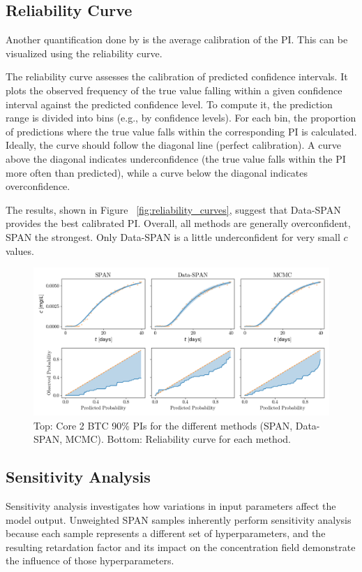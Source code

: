\subsection{Reliability Curve}
Another quantification done by \cite{finn} is the average calibration of the PI. This can be visualized using the reliability curve.

The reliability curve assesses the calibration of predicted confidence intervals. It plots the observed frequency of the true value falling within a given confidence interval against the predicted confidence level. To compute it, the prediction range is divided into bins (e.g., by confidence levels). For each bin, the proportion of predictions where the true value falls within the corresponding PI is calculated. Ideally, the curve should follow the diagonal line (perfect calibration). A curve above the diagonal indicates underconfidence (the true value falls within the PI more often than predicted), while a curve below the diagonal indicates overconfidence.

The results, shown in Figure ~\vref{fig:reliability_curves}, suggest that Data-SPAN provides the best calibrated PI. Overall, all methods are generally overconfident, SPAN the strongest. Only Data-SPAN is a little underconfident for very small $c$ values.

\begin{figure}[h]
    \centering
    \includegraphics{figs/reliability_curves.png}
    \caption{Top: Core 2 BTC 90\% PIs for the different methods (SPAN, Data-SPAN, MCMC). Bottom: Reliability curve for each method.}
    \label{fig:reliability_curves}
\end{figure}


\subsection{Sensitivity Analysis}
\label{sec:sensitivity}
Sensitivity analysis investigates how variations in input parameters affect the model output. Unweighted SPAN samples inherently perform sensitivity analysis because each sample represents a different set of hyperparameters, and the resulting retardation factor and its impact on the concentration field demonstrate the influence of those hyperparameters.

